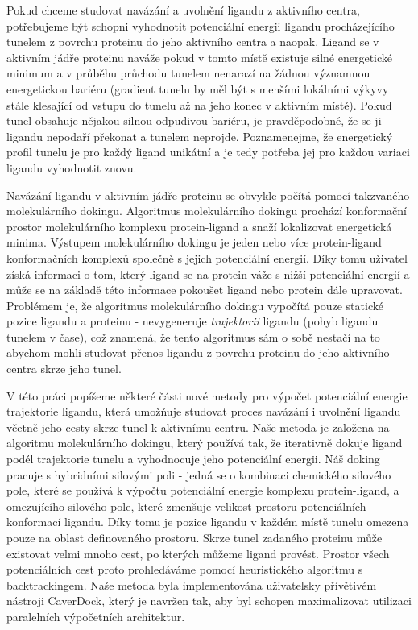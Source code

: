 Pokud chceme studovat navázání a uvolnění ligandu z aktivního centra, potřebujeme
být schopni vyhodnotit potenciální energii ligandu procházejícího tunelem
z povrchu proteinu do jeho aktivního centra a naopak. Ligand se v aktivním
jádře proteinu naváže pokud v tomto místě existuje silné energetické minimum
a v průběhu průchodu tunelem nenarazí na žádnou významnou energetickou bariéru
(gradient tunelu by měl být s menšími lokálními výkyvy stále klesající od
vstupu do tunelu až na jeho konec v aktivním místě). Pokud tunel obsahuje nějakou
silnou odpudivou bariéru, je pravděpodobné, že se ji ligandu nepodaří překonat
a tunelem neprojde. Poznamenejme, že energetický profil tunelu je pro každý
ligand unikátní a je tedy potřeba jej pro každou variaci ligandu vyhodnotit
znovu.

Navázání ligandu v aktivním jádře proteinu se obvykle počítá pomocí takzvaného
molekulárního dokingu. Algoritmus molekulárního dokingu prochází konformační
prostor molekulárního komplexu protein-ligand a snaží lokalizovat energetická
minima. Výstupem molekulárního dokingu je jeden nebo více protein-ligand
konformačních komplexů společně s jejich potenciální energií. Díky tomu
uživatel získá informaci o tom, který ligand se na protein váže s nižší potenciální
energií a může se na základě této informace pokoušet ligand nebo protein
dále upravovat. Problémem je, že algoritmus molekulárního dokingu vypočítá pouze
statické pozice ligandu a proteinu - nevygeneruje \textit{trajektorii} ligandu
(pohyb ligandu tunelem v čase), což znamená, že tento algoritmus sám o sobě
nestačí na to abychom mohli studovat přenos ligandu z povrchu proteinu
do jeho aktivního centra skrze jeho tunel.

V této práci popíšeme některé části nové metody pro výpočet potenciální energie
trajektorie ligandu, která umožňuje studovat proces navázání i uvolnění ligandu
včetně jeho cesty skrze tunel k aktivnímu centru. Naše metoda je založena na
algoritmu molekulárního dokingu, který používá tak, že iterativně dokuje ligand
podél trajektorie tunelu a vyhodnocuje jeho potenciální energii. Náš doking
pracuje s hybridními silovými poli - jedná se o kombinaci chemického silového
pole, které se používá k výpočtu potenciální energie komplexu protein-ligand,
a omezujícího silového pole, které zmenšuje velikost prostoru potenciálních
konformací ligandu. Díky tomu je pozice ligandu v každém místě tunelu
omezena pouze na oblast definovaného prostoru. Skrze tunel zadaného proteinu
může existovat velmi mnoho cest, po kterých můžeme ligand provést. Prostor
všech potenciálních cest proto prohledáváme pomocí heuristického algoritmu
s backtrackingem. Naše metoda byla implementována uživatelsky přívětivém
nástroji CaverDock, který je navržen tak, aby byl schopen maximalizovat utilizaci
paralelních výpočetních architektur.

